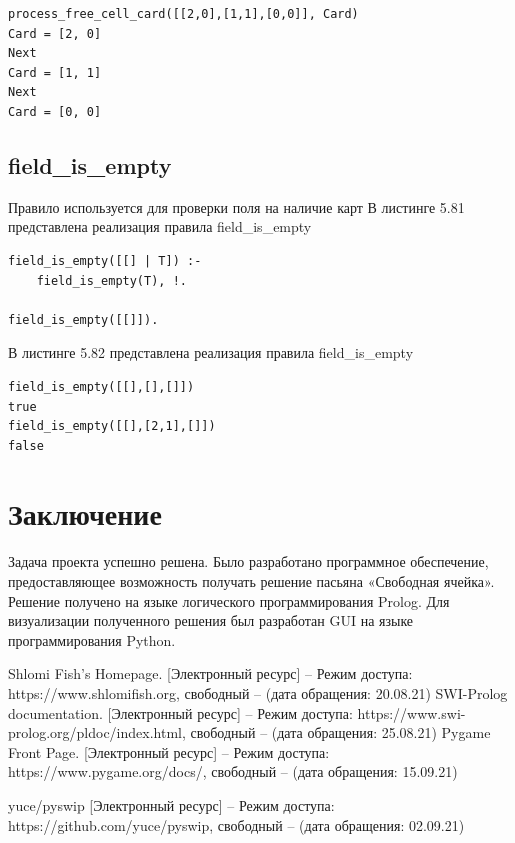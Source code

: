 \documentclass[12pt]{report}
\begin{document}
\begin{lstlisting}[label=some-code, caption=пример работы правила process\_free\_cell\_card] 
process_free_cell_card([[2,0],[1,1],[0,0]], Card)
Card = [2, 0]
Next
Card = [1, 1]
Next
Card = [0, 0]
\end{lstlisting}

\section{field\_is\_empty}
Правило используется для проверки поля на наличие карт
В листинге 5.81 представлена реализация правила field\_is\_empty

\begin{lstlisting}[label=some-code, caption=реализация правила field\_is\_empty] 
field_is_empty([[] | T]) :-
	field_is_empty(T), !.

field_is_empty([[]]).
\end{lstlisting}
В листинге 5.82 представлена реализация правила field\_is\_empty

\begin{lstlisting}[label=some-code, caption=пример работы правила field\_is\_empty] 
field_is_empty([[],[],[]])
true
field_is_empty([[],[2,1],[]])
false
\end{lstlisting}
 

\chapter*{Заключение}

Задача проекта успешно решена. Было разработано программное обеспечение, предоставляющее возможность получать решение пасьяна 
«Свободная ячейка». Решение получено на языке логического программирования Prolog. Для визуализации полученного решения был разработан GUI на языке программирования Python.

 \begin{thebibliography}{3}

 Shlomi Fish’s Homepage. [Электронный ресурс] – Режим доступа: https://www.shlomifish.org, свободный – (дата обращения: 20.08.21)
 SWI-Prolog documentation. [Электронный ресурс] – Режим доступа: https://www.swi-prolog.org/pldoc/index.html, свободный – (дата обращения: 25.08.21)
 Pygame Front Page. [Электронный ресурс] – Режим доступа: https://www.pygame.org/docs/, свободный – (дата обращения: 15.09.21)

 yuce/pyswip [Электронный ресурс] – Режим доступа: https://github.com/yuce/pyswip, свободный – (дата обращения: 02.09.21)
\end{thebibliography}
\end{document}
